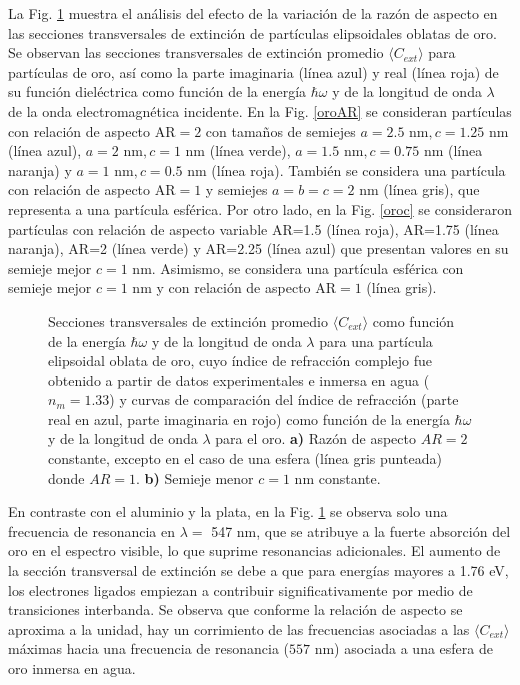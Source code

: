 La Fig. \ref{oro} muestra el análisis del efecto de la variación de la razón de aspecto en las secciones transversales de extinción de partículas elipsoidales oblatas de oro. Se observan las secciones transversales de extinción promedio  $\langle C_{ext}\rangle$ para partículas de oro, así como la parte imaginaria (línea azul) y real (línea roja) de su función dieléctrica como función de la energía $\hbar\omega$ y de la longitud de onda $\lambda$ de la onda electromagnética incidente. En la Fig. \ref{oroAR} se consideran partículas con relación de aspecto AR$=2$ con tamaños de semiejes $a=2.5 \text{ nm}, c=1.25 \text{ nm}$ (línea azul), $a=2 \text{ nm}, c=1 \text{ nm}$ (línea verde), $a=1.5 \text{ nm}, c=0.75 \text{ nm}$ (línea naranja) y $a=1 \text{ nm}, c=0.5 \text{ nm}$ (línea roja). También se considera una partícula con relación de aspecto AR$=1$ y semiejes $a=b=c=2$ nm (línea gris), que representa a una partícula esférica. Por otro lado, en la Fig. \ref{oroc} se consideraron partículas con relación de aspecto variable AR=1.5 (línea roja), AR=1.75 (línea naranja), AR=2 (línea verde) y AR=2.25 (línea azul) que presentan valores en su semieje mejor $c=1\text{ nm}$. Asimismo, se considera una partícula esférica con semieje mejor $c=1\text{ nm}$ y con relación de aspecto AR$=1$ (línea gris).
\begin{figure}[H]
	\quad%
	\caption{Secciones transversales de extinción promedio $\langle C_{ext}\rangle$ como función de la energía $\hbar\omega$ y de la longitud de onda $\lambda$ para una partícula elipsoidal oblata de oro, cuyo índice de refracción complejo fue obtenido a partir de datos experimentales  e inmersa en agua ($n_m=1.33$) y curvas de comparación del índice de refracción (parte real en azul, parte imaginaria en rojo) como función de la energía $\hbar\omega$ y de la longitud de onda $\lambda$ para el oro. \textbf{a)} Razón de aspecto $AR=2$ constante, excepto en el caso de una esfera (línea gris punteada) donde $AR=1$. \textbf{b)} Semieje menor $c=1$ nm constante.}\label{oro}
\end{figure}

En contraste con el aluminio y la plata, en la Fig. \ref{oro} se observa solo una frecuencia de resonancia en $\lambda=$ 547 nm, que se atribuye a la fuerte absorción del oro en el espectro visible, lo que suprime resonancias adicionales. El aumento de la sección transversal de extinción se debe a que para energías mayores a 1.76 eV, los electrones ligados empiezan a contribuir significativamente por medio de transiciones interbanda. Se observa que conforme la relación de aspecto se aproxima a la unidad, hay un corrimiento de las frecuencias asociadas a las $\langle C_{ext}\rangle$ máximas hacia una frecuencia de resonancia ($557\text{ nm}$) asociada a una esfera de oro inmersa en agua. 



